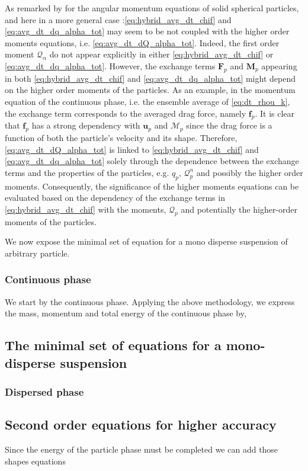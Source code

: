 As remarked by \citet{jackson1997locally} for the angular momentum equations of solid spherical particles, and here in a more general case :\ref{eq:hybrid_avg_dt_chif} and \ref{eq:avg_dt_dq_alpha_tot} may seem to be not coupled with the higher order moments equations, i.e. \ref{eq:avg_dt_dQ_alpha_tot}. 
Indeed, the first order moment $\mathcal{Q}_\alpha$ do not appear explicitly in either \ref{eq:hybrid_avg_dt_chif} or \ref{eq:avg_dt_dq_alpha_tot}.
However, the exchange terms 
$\textbf{F}_p$ 
and 
$\textbf{M}_p$ 
appearing in both \ref{eq:hybrid_avg_dt_chif} and \ref{eq:avg_dt_dq_alpha_tot} might depend on the higher order moments of the particles.
As an example, in the momentum equation of the continuous phase, i.e. the ensemble average of \ref{eq:dt_rhou_k}, the exchange term corresponds to the averaged drag force, namely $\textbf{f}_p$. 
It is clear that $\textbf{f}_p$ has a strong dependency with $\textbf{u}_p$ and $\mathcal{M}_p$ since the drag force is a function of both the particle's velocity and its shape. 
Therefore, \ref{eq:avg_dt_dQ_alpha_tot} is linked to \ref{eq:hybrid_avg_dt_chif} and \ref{eq:avg_dt_dq_alpha_tot} solely through the dependence between the exchange terms and the properties of the particles, e.g. $q_p$, $\mathcal{Q}^n_p$ and possibly the higher order moments. 
Consequently, the significance of the higher moments equations can be evaluated based on the dependency of the exchange terms in \ref{eq:hybrid_avg_dt_chif} with the moments,  $\mathcal{Q}_p$ and potentially the higher-order moments of the particles. 

We now expose the minimal set of equation for a mono disperse suspension of arbitrary particle. 

\subsubsection{Continuous phase}

We start by the continuous phase. 
Applying the above methodology, we express the mass, momentum and total energy of the continuous phase by, 


\subsection{The minimal set of equations for a mono-disperse suspension}


\subsubsection{Dispersed phase}

\subsection{Second order equations for higher accuracy}
Since the energy of the particle phase must be completed we can add those shapes equations

